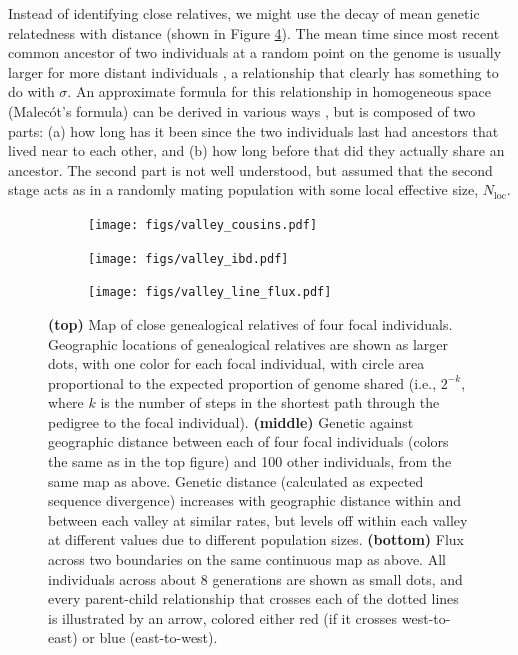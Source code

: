 \documentclass{ar-1col}
\begin{document}
Instead of identifying close relatives,
we might use the decay of mean genetic relatedness with distance
(shown in Figure \ref{fig:dispersal}).
The mean time since most recent common ancestor 
of two individuals at a random point on the genome
is usually larger for more distant individuals \citep{ibd_review},
a relationship that clearly has something to do with $\sigma$.
An approximate formula for this relationship
in homogeneous space (Malec\'ot's formula)
can be derived in various ways 
\citep{malecot, sawyer1976branching, rousset_1997, barton-depaulis-etheridge, robledoarnuncio, ringbauer2017inferring, alasadi2018estimating},
but is composed of two parts: 
(a) how long has it been since the two individuals last had ancestors that lived near to each other,
and (b) how long before that did they actually share an ancestor.
The second part is not well understood,
but \citet{malecot} assumed that the second stage acts as in a randomly mating population
with some local effective size, $N_\text{loc}$.


\begin{figure}	%
    \centering
    \begin{subfigure}{0.49\linewidth}
        \centering
        \texttt{[image: figs/valley\_cousins.pdf]}
        \label{cousin_map}
    \end{subfigure}
    \begin{subfigure}{0.49\linewidth}
        \centering
        \texttt{[image: figs/valley\_ibd.pdf]}
        \label{ibd}
    \end{subfigure}
    \begin{subfigure}{\textwidth}
        \centering
        \texttt{[image: figs/valley\_line\_flux.pdf]}
        \label{valleyflux}
    \end{subfigure}
        \caption{
            \textbf{(top)} Map of close genealogical relatives of four focal individuals.
            Geographic locations of 
            genealogical relatives are shown as larger dots, with one color for each focal individual,
            with circle area proportional to the expected proportion of genome shared
            (i.e., $2^{-k}$, where $k$ is the number of steps in the shortest path through the pedigree to the focal individual).
            \textbf{(middle)}
            Genetic against geographic distance between each of four focal individuals
            (colors the same as in the top figure)
            and 100 other individuals, from the same map as above.
            Genetic distance (calculated as expected sequence divergence)
            increases with geographic distance within and between each valley at similar rates,
            but levels off within each valley at different values
            due to different population sizes.
            \textbf{(bottom)}
            Flux across two boundaries on the same continuous map as above.
            All individuals across about 8 generations are shown as small dots,
            and every parent-child relationship that crosses each of the dotted lines
            is illustrated by an arrow, colored either red (if it crosses west-to-east) or blue (east-to-west).
        }
        \label{fig:dispersal}
\end{figure}
\end{document}
